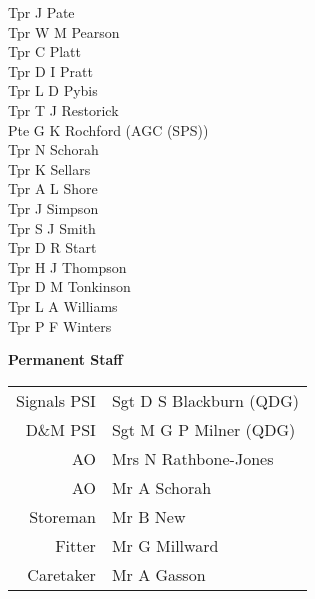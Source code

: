 \begin{multicols}{2}
  Tpr J Pate \\
  Tpr W M Pearson \\
  Tpr C Platt \\
  Tpr D I Pratt \\
  Tpr L D Pybis \\
  Tpr T J Restorick \\
  Pte G K Rochford (AGC (SPS)) \\
  Tpr N Schorah \\
  Tpr K Sellars \\
  Tpr A L Shore \\
  Tpr J Simpson \\
  Tpr S J Smith \\
  Tpr D R Start \\
  Tpr H J Thompson \\
  Tpr D M Tonkinson \\
  Tpr L A Williams \\
  Tpr P F Winters \\
\end{multicols}

\begin{center}
  \Large
  \textbf{Permanent Staff}
\end{center}

\begin{center}
  \begin{tabular}{rl}
    Signals PSI & Sgt D S Blackburn (QDG) \\
    D\&M PSI & Sgt M G P Milner (QDG) \\
    AO & Mrs N Rathbone-Jones \\
    AO & Mr A Schorah \\
    Storeman & Mr B New \\
    Fitter & Mr G Millward \\
    Caretaker & Mr A Gasson \\
  \end{tabular}
\end{center}
